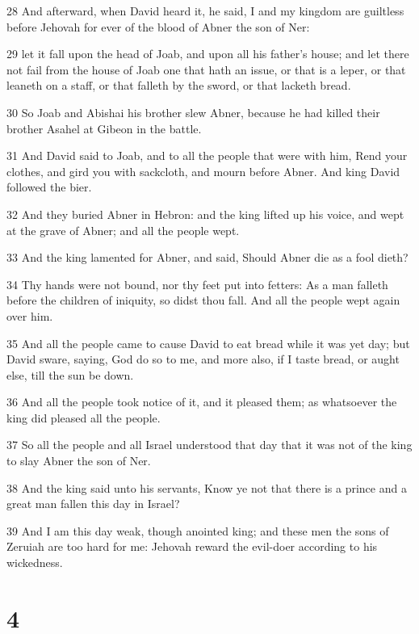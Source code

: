 \par 28 And afterward, when David heard it, he said, I and my kingdom are guiltless before Jehovah for ever of the blood of Abner the son of Ner:
\par 29 let it fall upon the head of Joab, and upon all his father's house; and let there not fail from the house of Joab one that hath an issue, or that is a leper, or that leaneth on a staff, or that falleth by the sword, or that lacketh bread.
\par 30 So Joab and Abishai his brother slew Abner, because he had killed their brother Asahel at Gibeon in the battle.
\par 31 And David said to Joab, and to all the people that were with him, Rend your clothes, and gird you with sackcloth, and mourn before Abner. And king David followed the bier.
\par 32 And they buried Abner in Hebron: and the king lifted up his voice, and wept at the grave of Abner; and all the people wept.
\par 33 And the king lamented for Abner, and said, Should Abner die as a fool dieth?
\par 34 Thy hands were not bound, nor thy feet put into fetters: As a man falleth before the children of iniquity, so didst thou fall. And all the people wept again over him.
\par 35 And all the people came to cause David to eat bread while it was yet day; but David sware, saying, God do so to me, and more also, if I taste bread, or aught else, till the sun be down.
\par 36 And all the people took notice of it, and it pleased them; as whatsoever the king did pleased all the people.
\par 37 So all the people and all Israel understood that day that it was not of the king to slay Abner the son of Ner.
\par 38 And the king said unto his servants, Know ye not that there is a prince and a great man fallen this day in Israel?
\par 39 And I am this day weak, though anointed king; and these men the sons of Zeruiah are too hard for me: Jehovah reward the evil-doer according to his wickedness.

\chapter{4}

